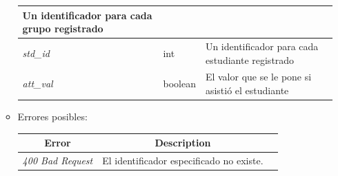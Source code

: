 \documentclass{article}
\begin{document}
\begin{enumerate}[i.]
\begin{itemize}
\begin{table}[H]
\begin{tabular}{|l|l|l|}
        Un identificador para cada grupo registrado \\ \hline \textit{std\_id} &
        int & Un identificador para cada estudiante registrado \\ \hline
        \textit{att\_val} & boolean & El valor que se le pone si asistió el
        estudiante \\ \hline \end{tabular} \end{table}
        \item Errores posibles:
        \begin{table}[H] \centering \begin{tabular}{|c|c|l|} \hline \textbf{Error} &
        \textbf{Description} \\ \hline \textit{400 Bad Request} & El
        identificador especificado no existe. \\ \hline
        \end{tabular} \end {table}
    \end{itemize}


\end{enumerate}
\end{document}
